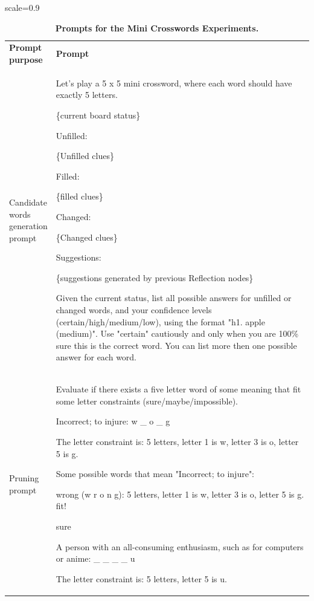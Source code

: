 \documentclass{article}
\theoremstyle{plain}
\theoremstyle{definition}
\theoremstyle{remark}
\begin{document}
\begin{table}[h!]
  \centering
  \caption{\textbf{Prompts for the Mini Crosswords Experiments.}}
  \label{tab:cw_prompts}
  
  \renewcommand\tabcolsep{10pt}
  \renewcommand\arraystretch{1.2}
  \footnotesize 
  \begin{adjustbox}{scale=0.9}

  \begin{tabular}{|p{0.15\linewidth}|p{0.85\linewidth}|}
    \Xhline{1.2pt}
    \rowcolor{champagne} 
    \textbf{Prompt purpose} & \textbf{Prompt} \\
    \Xhline{1.2pt}
        Candidate words generation prompt &Let's play a 5 x 5 mini crossword, where each word should have exactly 5 letters.

\{current board status\}

Unfilled:

\{Unfilled clues\}

Filled:

\{filled clues\}

Changed:

\{Changed clues\}

Suggestions:

\{suggestions generated by previous Reflection nodes\}

Given the current status, list all possible answers for unfilled or changed words, and your confidence levels (certain/high/medium/low), using the format "h1. apple (medium)". Use "certain" cautiously and only when you are 100\% sure this is the correct word. You can list more then one possible answer for each word.


   \\  \Xhline{1.2pt}
   Pruning prompt
    &  Evaluate if there exists a five letter word of some meaning that fit some letter constraints (sure/maybe/impossible).

Incorrect; to injure: w \_ o \_ g

The letter constraint is: 5 letters, letter 1 is w, letter 3 is o, letter 5 is g.

Some possible words that mean "Incorrect; to injure":

wrong (w r o n g): 5 letters, letter 1 is w, letter 3 is o, letter 5 is g. fit!

sure

A person with an all-consuming enthusiasm, such as for computers or anime: \_ \_ \_ \_ u

The letter constraint is: 5 letters, letter 5 is u.


\end{tabular}
\end{adjustbox}
\end{table}
\end{document}
